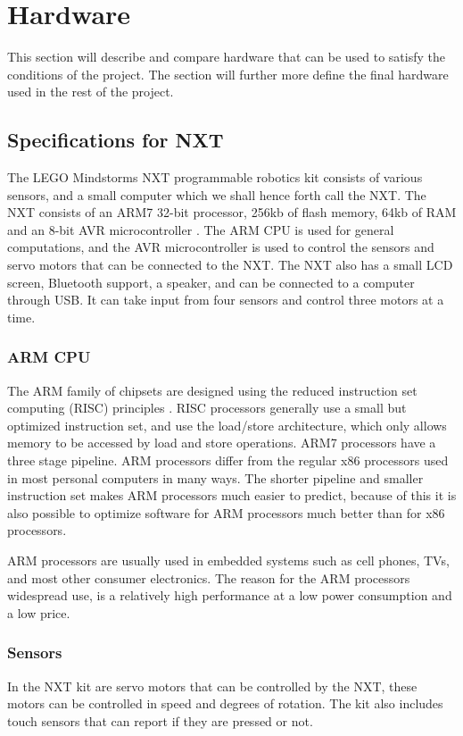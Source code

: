 \section{Hardware}
This section will describe and compare hardware that can be used to satisfy the conditions of the project. The section will further more define the final hardware used in the rest of the project.

\subsection{Specifications for NXT}
The LEGO Mindstorms NXT programmable robotics kit consists of various sensors, and a small computer which we shall hence forth call the NXT. The NXT consists of an ARM7 32-bit processor, 256kb of flash memory, 64kb of RAM and an 8-bit AVR microcontroller \cite{nxtspec}. The ARM CPU is used for general computations, and the AVR microcontroller is used to control the sensors and servo motors that can be connected to the NXT. The NXT also has a small LCD screen, Bluetooth support, a speaker, and can be connected to a computer through USB. It can take input from four sensors and control three motors at a time.

\subsubsection{ARM CPU}
The ARM family of chipsets are designed using the reduced instruction set computing (RISC) principles \cite{armarchitecture}. RISC processors generally use a small but optimized instruction set, and use the load/store architecture, which only allows memory to be accessed by load and store operations. ARM7 processors have a three stage pipeline. ARM processors differ from the regular x86 processors used in most personal computers in many ways. The shorter pipeline and smaller instruction set makes ARM processors much easier to predict, because of this it is also possible to optimize software for ARM processors much better than for x86 processors.

ARM processors are usually used in embedded systems such as cell phones, TVs, and most other consumer electronics. The reason for the ARM processors widespread use, is a relatively high performance at a low power consumption and a low price.

\subsubsection{Sensors}
In the NXT kit are servo motors that can be controlled by the NXT, these motors can be controlled in speed and degrees of rotation. The kit also includes touch sensors that can report if they are pressed or not.


